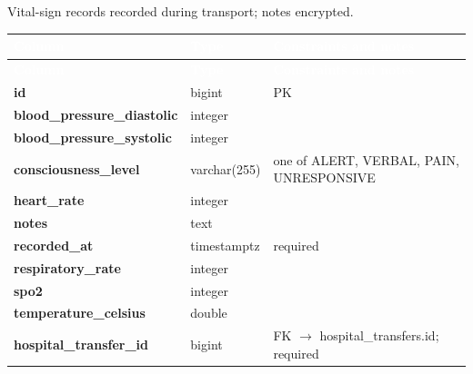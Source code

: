 \subsection*{}
Vital-sign records recorded during transport; notes encrypted.\par\vspace{2pt}
{\tabfont\rowband
\begin{longtable}{@{}>{\raggedright\arraybackslash}p{}>{\raggedright\arraybackslash}p{}>{\raggedright\arraybackslash}p{}@{}}
\rowcolor{najdanavy}\textcolor{white}{\sffamily\bfseries\small Column} & \textcolor{white}{\sffamily\bfseries\small Type} & \textcolor{white}{\sffamily\bfseries\small Constraints and notes}\\
\endfirsthead
\rowcolor{najdanavy}\textcolor{white}{\sffamily\bfseries\small Column} & \textcolor{white}{\sffamily\bfseries\small Type} & \textcolor{white}{\sffamily\bfseries\small Constraints and notes}\\
\endhead
\bottomrule\endlastfoot
\textbf{id} & bigint & PK\\
\textbf{blood\_\allowbreak{}pressure\_\allowbreak{}diastolic} & integer & \\
\textbf{blood\_\allowbreak{}pressure\_\allowbreak{}systolic} & integer & \\
\textbf{consciousness\_\allowbreak{}level} & varchar(255) & one of ALERT, VERBAL, PAIN, UNRESPONSIVE\\
\textbf{heart\_\allowbreak{}rate} & integer & \\
\textbf{notes} & text & \\
\textbf{recorded\_\allowbreak{}at} & timestamptz & required\\
\textbf{respiratory\_\allowbreak{}rate} & integer & \\
\textbf{spo2} & integer & \\
\textbf{temperature\_\allowbreak{}celsius} & double & \\
\textbf{hospital\_\allowbreak{}transfer\_\allowbreak{}id} & bigint & FK $\rightarrow$ hospital\_\allowbreak{}transfers.id; required\\
\end{longtable}}

